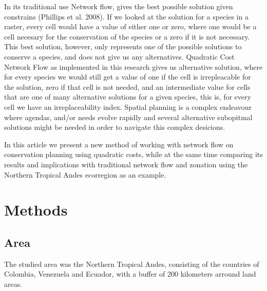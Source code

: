 \documentclass[]{article}
\begin{document}
In its traditional use Network flow, gives the best possible solution given constrains (Phillips et al. 2008). If we looked at the solution for a species in a raster, every cell would have a value of either one or zero, where one would be a cell necesary for the conservation of the species or a zero if it is not necessary. This best solution, however, only represents one of the possible solutions to conserve a species, and does not give us any alternatives. Quadratic Cost Network Flow as implemented in this research gives us alternative solution, where for every species we would still get a value of one if the cell is irrepleacable for the solution, zero if that cell is not needed, and an intermediate value for cells that are one of many alternative solutions for a given species, this is, for every cell we have an irreplaceability index. Spatial planning is a complex endeavour where agendas, and/or needs evolve rapidly and several alternative subopitmal solutions might be needed in order to navigate this complex desicions.

In this article we present a new method of working with network flow on conservation planning using quadratic costs, while at the same time comparing its results and implications with traditional network flow and zonation using the Northern Tropical Andes ecorregion as an example.

\hypertarget{methods}{%
\section{Methods}\label{methods}}

\hypertarget{area}{%
\subsection{Area}\label{area}}

The studied area was the Northern Tropical Andes, consisting of the countries of Colombia, Venezuela and Ecuador, with a buffer of 200 kilometers arround land areas.
\end{document}

